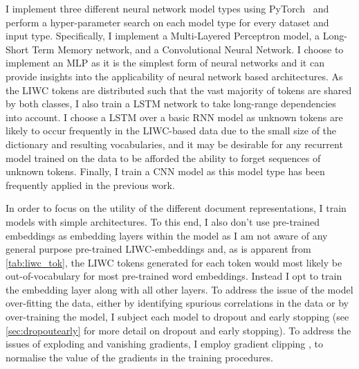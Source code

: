 I implement three different neural network model types using PyTorch~\citep{Paszke:2019} and perform a hyper-parameter search on each model type for every dataset and input type. Specifically, I implement a Multi-Layered Perceptron model, a Long-Short Term Memory network, and a Convolutional Neural Network.
I choose to implement an MLP as it is the simplest form of neural networks and it can provide insights into the applicability of neural network based architectures.
As the LIWC tokens are distributed such that the vast majority of tokens are shared by both classes, I also train a LSTM network to take long-range dependencies into account. 
I choose a LSTM over a basic RNN model as unknown tokens are likely to occur frequently in the LIWC-based data due to the small size of the dictionary and resulting vocabularies, and it may be desirable for any recurrent model trained on the data to be afforded the ability to forget sequences of unknown tokens.
Finally, I train a CNN model as this model type has been frequently applied in the previous work.

In order to focus on the utility of the different document representations, I train models with simple architectures. 
To this end, I also don't use pre-trained embeddings as embedding layers within the model as I am not aware of any general purpose pre-trained LIWC-embeddings and, as is apparent from \cref{tab:liwc_tok}, the LIWC tokens generated for each token would most likely be out-of-vocabulary for most pre-trained word embeddings. 
Instead I opt to train the embedding layer along with all other layers.
To address the issue of the model over-fitting the data, either by identifying spurious correlations in the data or by over-training the model, I subject each model to dropout and early stopping (see \cref{sec:dropoutearly} for more detail on dropout and early stopping). 
To address the issues of exploding and vanishing gradients, I employ gradient clipping \citep{Bengio:1994}, to normalise the value of the gradients in the training procedures.

